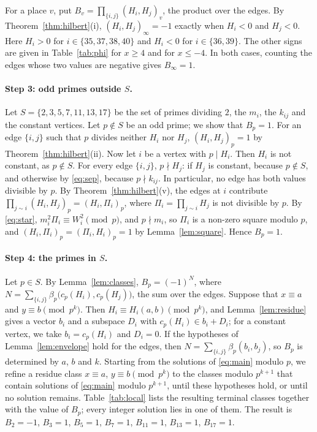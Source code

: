 \documentclass[11pt]{article}
\begin{document}
For a place $v$, put $B_v=\prod_{\{i,j\}}(H_i,H_j)_v$, the product over the edges. By Theorem~\ref{thm:hilbert}(i), $(H_i,H_j)_\infty=-1$ exactly when $H_i<0$ and $H_j<0$. Here $H_i>0$ for $i\in\{35,\allowbreak 37,\allowbreak 38,\allowbreak 40\}$ and $H_i<0$ for $i\in\{36,\allowbreak 39\}$. The other signs are given in Table~\ref{tab:phi} for $x\geq4$ and for $x\leq-4$. In both cases, counting the edges whose two values are negative gives $B_\infty=1$.

\paragraph{Step 3: odd primes outside $S$.} Let $S=\{2,3,5,7,11,13,17\}$ be the set of primes dividing $2$, the $m_{i}$, the $k_{ij}$ and the constant vertices. Let $p\notin S$ be an odd prime; we show that $B_p=1$. For an edge $\{i,j\}$ such that $p$ divides neither $H_i$ nor $H_j$, $(H_i,H_j)_p=1$ by Theorem~\ref{thm:hilbert}(ii). Now let $i$ be a vertex with $p\mid H_i$. Then $H_i$ is not constant, as $p\notin S$. For every edge $\{i,j\}$, $p\nmid H_j$: if $H_j$ is constant, because $p\notin S$, and otherwise by \eqref{eq:sep}, because $p\nmid k_{ij}$. In particular, no edge has both values divisible by $p$. By Theorem~\ref{thm:hilbert}(v), the edges at $i$ contribute $\prod_{j\sim i}(H_i,H_j)_p=(H_i,\Pi_i)_p$, where $\Pi_i=\prod_{j\sim i}H_j$ is not divisible by $p$. By \eqref{eq:star}, $m_i^2\Pi_i\equiv W_i^2\pmod p$, and $p\nmid m_i$, so $\Pi_i$ is a non-zero square modulo $p$, and $(H_i,\Pi_i)_p=(\Pi_i,H_i)_p=1$ by Lemma~\ref{lem:square}. Hence $B_p=1$.

\paragraph{Step 4: the primes in $S$.} Let $p\in S$. By Lemma~\ref{lem:classes}, $B_p=(-1)^{N}$, where $N=\sum_{\{i,j\}}\beta_p\bigl(c_p(H_i),c_p(H_j)\bigr)$, the sum over the edges. Suppose that $x\equiv a$ and $y\equiv b\pmod{p^k}$. Then $H_i\equiv H_i(a,b)\pmod{p^k}$, and Lemma~\ref{lem:residue} gives a vector $b_i$ and a subspace $D_i$ with $c_p(H_i)\in b_i+D_i$; for a constant vertex, we take $b_i=c_p(H_i)$ and $D_i=0$. If the hypotheses of Lemma~\ref{lem:envelope} hold for the edges, then $N=\sum_{\{i,j\}}\beta_p(b_i,b_j)$, so $B_p$ is determined by $a$, $b$ and $k$. Starting from the solutions of \eqref{eq:main} modulo $p$, we refine a residue class $x\equiv a$, $y\equiv b\pmod{p^k}$ to the classes modulo $p^{k+1}$ that contain solutions of \eqref{eq:main} modulo $p^{k+1}$, until these hypotheses hold, or until no solution remains. Table~\ref{tab:local} lists the resulting terminal classes together with the value of $B_p$; every integer solution lies in one of them. The result is $B_{2}=-1$, $B_{3}=1$, $B_{5}=1$, $B_{7}=1$, $B_{11}=1$, $B_{13}=1$, $B_{17}=1$.
\end{document}

